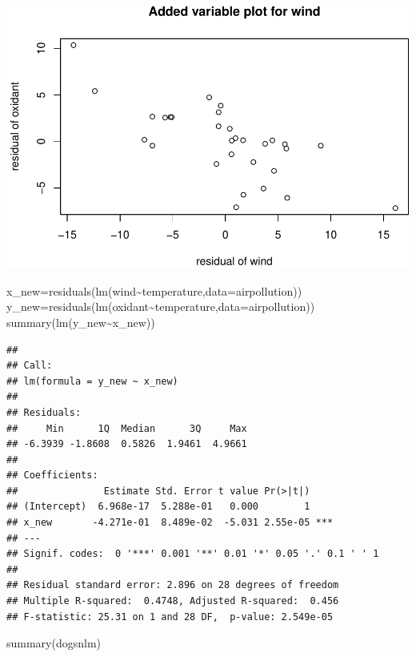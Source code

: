 \documentclass[
]{article}
\newenvironment{Shaded}{\begin{snugshade}}{\end{snugshade}}
\newcommand{\AttributeTok}[1]{\textcolor[rgb]{0.77,0.63,0.00}{#1}}
\newcommand{\FunctionTok}[1]{\textcolor[rgb]{0.00,0.00,0.00}{#1}}
\newcommand{\NormalTok}[1]{#1}
\newcommand{\OtherTok}[1]{\textcolor[rgb]{0.56,0.35,0.01}{#1}}
\newcommand{\SpecialCharTok}[1]{\textcolor[rgb]{0.00,0.00,0.00}{#1}}
\begin{document}
\includegraphics{Assignment2_complete_files/figure-latex/unnamed-chunk-12-1.pdf}

\begin{Shaded}
\begin{Highlighting}[]
\NormalTok{x\_new}\OtherTok{=}\FunctionTok{residuals}\NormalTok{(}\FunctionTok{lm}\NormalTok{(wind}\SpecialCharTok{\textasciitilde{}}\NormalTok{temperature,}\AttributeTok{data=}\NormalTok{airpollution))}
\NormalTok{y\_new}\OtherTok{=}\FunctionTok{residuals}\NormalTok{(}\FunctionTok{lm}\NormalTok{(oxidant}\SpecialCharTok{\textasciitilde{}}\NormalTok{temperature,}\AttributeTok{data=}\NormalTok{airpollution))}
\FunctionTok{summary}\NormalTok{(}\FunctionTok{lm}\NormalTok{(y\_new}\SpecialCharTok{\textasciitilde{}}\NormalTok{x\_new))}
\end{Highlighting}
\end{Shaded}

\begin{verbatim}
## 
## Call:
## lm(formula = y_new ~ x_new)
## 
## Residuals:
##     Min      1Q  Median      3Q     Max 
## -6.3939 -1.8608  0.5826  1.9461  4.9661 
## 
## Coefficients:
##               Estimate Std. Error t value Pr(>|t|)    
## (Intercept)  6.968e-17  5.288e-01   0.000        1    
## x_new       -4.271e-01  8.489e-02  -5.031 2.55e-05 ***
## ---
## Signif. codes:  0 '***' 0.001 '**' 0.01 '*' 0.05 '.' 0.1 ' ' 1
## 
## Residual standard error: 2.896 on 28 degrees of freedom
## Multiple R-squared:  0.4748, Adjusted R-squared:  0.456 
## F-statistic: 25.31 on 1 and 28 DF,  p-value: 2.549e-05
\end{verbatim}

\begin{Shaded}
\begin{Highlighting}[]
\FunctionTok{summary}\NormalTok{(dogsnlm)}
\end{Highlighting}
\end{Shaded}
\end{document}
